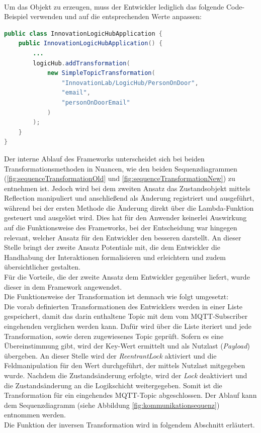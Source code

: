     \\
    Um das Objekt zu erzeugen, muss der Entwickler lediglich das folgende Code-Beispiel verwenden und auf die entsprechenden Werte anpassen:
\begin{lstlisting}[language=Java, frame=lines, xleftmargin=\parindent, style=algoBericht, label={code:object}, captionpos=b, caption={Transformation über ein eigenes Objekt}]
public class InnovationLogicHubApplication {
    public InnovationLogicHubApplication() {
        ... 
        logicHub.addTransformation(
            new SimpleTopicTransformation(
                "InnovationLab/LogicHub/PersonOnDoor",
                "email",
                "personOnDoorEmail"
            )
        );
    }
}
\end{lstlisting}
    Der interne Ablauf des Frameworks unterscheidet sich bei beiden Transformationsmethoden in Nuancen, wie den beiden Sequenzdiagrammen 
    (\ref{fig:sequenceTransformationOld} und \ref{fig:sequenceTransformationNew}) zu entnehmen ist. Jedoch wird bei dem zweiten Ansatz 
    das Zustandsobjekt mittels Reflection manipuliert und anschließend als Änderung registriert und ausgeführt, während bei der ersten Methode 
    die Änderung direkt über die Lambda-Funktion gesteuert und ausgelöst wird. Dies hat für den Anwender keinerlei Auswirkung auf die 
    Funktionsweise des Frameworks, bei der Entscheidung war hingegen relevant, welcher Ansatz für den Entwickler den besseren darstellt. 
    An dieser Stelle bringt der zweite Ansatz Potentiale mit, die dem Entwickler die 
    Handhabung der Interaktionen formalisieren und erleichtern und zudem übersichtlicher gestalten.
    \\
    \linebreak
    Für die Vorteile, die der zweite Ansatz dem Entwickler gegenüber liefert, wurde dieser in dem Framework angewendet. 
    \\
    \linebreak
    Die Funktionsweise der Transformation ist demnach wie folgt umgesetzt:
    \\
    Die vorab definierten Transformationen des Entwicklers werden in einer Liste gespeichert, damit das darin enthaltene Topic mit dem vom \acs{MQTT}-Subscriber eingehenden 
    verglichen werden kann. Dafür wird über die Liste iteriert und jede Transformation, sowie deren zugewiesenes Topic geprüft. Sofern 
    es eine Übereinstimmung gibt, wird der Key-Wert ermittelt und als Nutzlast (\textit{Payload}) übergeben. An dieser Stelle wird der \textit{ReentrantLock} aktiviert 
    und die Feldmanipulation für den Wert durchgeführt, der mittels Nutzlast mitgegeben wurde. Nachdem die Zustandsänderung erfolgte, wird der \textit{Lock} deaktiviert und 
    die Zustandsänderung an die Logikschicht weitergegeben. Somit ist die Transformation für ein eingehendes \acs{MQTT}-Topic abgeschlossen. Der Ablauf kann dem Sequenzdiagramm (siehe Abbildung \ref{fig:kommunikationsequenz}) entnommen werden.  
    \\
    Die Funktion der inversen Transformation wird in folgendem Abschnitt erläutert.

